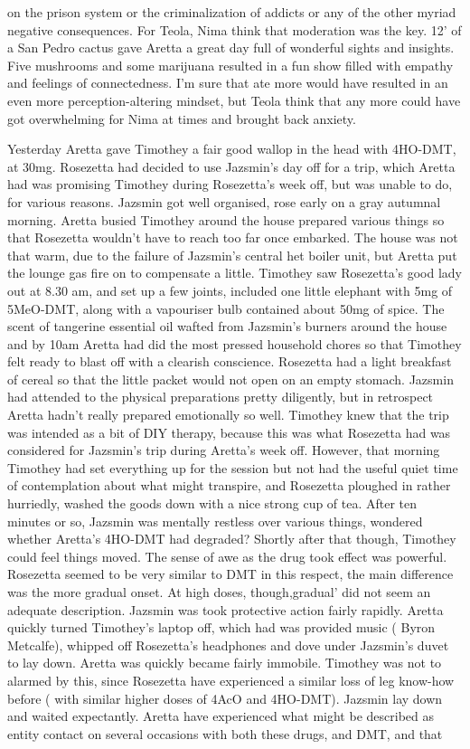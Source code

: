 \documentclass[12pt]{book}
\begin{document}
on the prison system or the criminalization of addicts or any of the other myriad negative consequences. For Teola, Nima think that moderation was the key. 12' of a San Pedro cactus gave Aretta a great day full of wonderful sights and insights. Five mushrooms and some marijuana resulted in a fun show filled with empathy and feelings of connectedness. I'm sure that ate more would have resulted in an even more perception-altering mindset, but Teola think that any more could have got overwhelming for Nima at times and brought back anxiety.



Yesterday Aretta gave Timothey a fair good wallop in the head with 4HO-DMT, at 30mg. Rosezetta had decided to use Jazsmin's day off for a trip, which Aretta had was promising Timothey during Rosezetta's week off, but was unable to do, for various reasons. Jazsmin got well organised, rose early on a gray autumnal morning. Aretta busied Timothey around the house prepared various things so that Rosezetta wouldn't have to reach too far once embarked. The house was not that warm, due to the failure of Jazsmin's central het boiler unit, but Aretta put the lounge gas fire on to compensate a little. Timothey saw Rosezetta's good lady out at 8.30 am, and set up a few joints, included one little elephant with 5mg of 5MeO-DMT, along with a vapouriser bulb contained about 50mg of spice. The scent of tangerine essential oil wafted from Jazsmin's burners around the house and by 10am Aretta had did the most pressed household chores so that Timothey felt ready to blast off with a clearish conscience. Rosezetta had a light breakfast of cereal so that the little packet would not open on an empty stomach. Jazsmin had attended to the physical preparations pretty diligently, but in retrospect Aretta hadn't really prepared emotionally so well. Timothey knew that the trip was intended as a bit of DIY therapy, because this was what Rosezetta had was considered for Jazsmin's trip during Aretta's week off. However, that morning Timothey had set everything up for the session but not had the useful quiet time of contemplation about what might transpire, and Rosezetta ploughed in rather hurriedly, washed the goods down with a nice strong cup of tea. After ten minutes or so, Jazsmin was mentally restless over various things, wondered whether Aretta's 4HO-DMT had degraded? Shortly after that though, Timothey could feel things moved. The sense of awe as the drug took effect was powerful. Rosezetta seemed to be very similar to DMT in this respect, the main difference was the more gradual onset. At high doses, though,gradual' did not seem an adequate description. Jazsmin was took protective action fairly rapidly. Aretta quickly turned Timothey's laptop off, which had was provided music ( Byron Metcalfe), whipped off Rosezetta's headphones and dove under Jazsmin's duvet to lay down. Aretta was quickly became fairly immobile. Timothey was not to alarmed by this, since Rosezetta have experienced a similar loss of leg know-how before ( with similar higher doses of 4AcO and 4HO-DMT). Jazsmin lay down and waited expectantly. Aretta have experienced what might be described as entity contact on several occasions with both these drugs, and DMT, and that 
\end{document}
